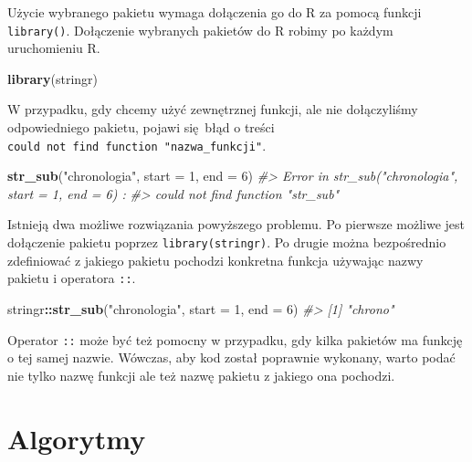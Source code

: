 \documentclass[paper=6in:9in,pagesize=pdftex,headinclude=on,footinclude=on,10pt]{scrbook}
\makeatletter
\newenvironment{Shaded}{\begin{snugshade}}{\end{snugshade}}
\newcommand{\CommentTok}[1]{\textcolor[rgb]{0.56,0.35,0.01}{\textit{#1}}}
\newcommand{\DataTypeTok}[1]{\textcolor[rgb]{0.13,0.29,0.53}{#1}}
\newcommand{\DecValTok}[1]{\textcolor[rgb]{0.00,0.00,0.81}{#1}}
\newcommand{\KeywordTok}[1]{\textcolor[rgb]{0.13,0.29,0.53}{\textbf{#1}}}
\newcommand{\NormalTok}[1]{#1}
\newcommand{\OperatorTok}[1]{\textcolor[rgb]{0.81,0.36,0.00}{\textbf{#1}}}
\newcommand{\StringTok}[1]{\textcolor[rgb]{0.31,0.60,0.02}{#1}}
\newenvironment{kframe}{%
\medskip{}
\setlength{\fboxsep}{.8em}
 \def\at@end@of@kframe{}%
 \ifinner\ifhmode%
  \def\at@end@of@kframe{\end{minipage}}%
  \begin{minipage}{\columnwidth}%
 \fi\fi%
 \def\FrameCommand##1{\hskip\@totalleftmargin \hskip-\fboxsep
 \colorbox{shadecolor}{##1}\hskip-\fboxsep
     \hskip-\linewidth \hskip-\@totalleftmargin \hskip\columnwidth}%
 \MakeFramed {\advance\hsize-\width
   \@totalleftmargin\z@ \linewidth\hsize
   \@setminipage}}%
 {\par\unskip\endMakeFramed%
 \at@end@of@kframe}
\newenvironment{rmdblock}[1]
  {
  \begin{itemize}
  \renewcommand{\labelitemi}{
    \raisebox{-.7\height}[0pt][0pt]{
      {\setkeys{Gin}{width=3em,keepaspectratio}\texttt{[image: images/\#1]}}
    }
  }
  \setlength{\fboxsep}{1em}
  \begin{kframe}
  \item
  }
  {
  \end{kframe}
  \end{itemize}
  }
\newenvironment{rmdinfo}
  {\begin{rmdblock}{compass}}
  {\end{rmdblock}}
\makeatother
\begin{document}
Użycie wybranego pakietu wymaga dołączenia go do R za pomocą funkcji \texttt{library()}.
Dołączenie wybranych pakietów do R robimy po każdym uruchomieniu R.

\begin{Shaded}
\begin{Highlighting}[]
\KeywordTok{library}\NormalTok{(stringr)}
\end{Highlighting}
\end{Shaded}

W przypadku, gdy chcemy użyć zewnętrznej funkcji, ale nie dołączyliśmy odpowiedniego pakietu, pojawi się~błąd o treści \texttt{could\ not\ find\ function\ "nazwa\_funkcji"}.

\begin{Shaded}
\begin{Highlighting}[]
\KeywordTok{str_sub}\NormalTok{(}\StringTok{"chronologia"}\NormalTok{, }\DataTypeTok{start =} \DecValTok{1}\NormalTok{, }\DataTypeTok{end =} \DecValTok{6}\NormalTok{)}
\CommentTok{#> Error in str_sub("chronologia", start = 1, end = 6) : }
\CommentTok{#>  could not find function "str_sub"}
\end{Highlighting}
\end{Shaded}

Istnieją dwa możliwe rozwiązania powyższego problemu.
Po pierwsze możliwe jest dołączenie pakietu poprzez \texttt{library(stringr)}.
Po drugie można bezpośrednio zdefiniować z jakiego pakietu pochodzi konkretna funkcja używając nazwy pakietu i operatora \texttt{::}.

\begin{Shaded}
\begin{Highlighting}[]
\NormalTok{stringr}\OperatorTok{::}\KeywordTok{str_sub}\NormalTok{(}\StringTok{"chronologia"}\NormalTok{, }\DataTypeTok{start =} \DecValTok{1}\NormalTok{, }\DataTypeTok{end =} \DecValTok{6}\NormalTok{)}
\CommentTok{#> [1] "chrono"}
\end{Highlighting}
\end{Shaded}

\begin{rmdinfo}
Operator \texttt{::} może być też pomocny w przypadku, gdy kilka pakietów ma funkcję o tej samej nazwie.
Wówczas, aby kod został poprawnie wykonany, warto podać nie tylko nazwę funkcji ale też nazwę pakietu z jakiego ona pochodzi.
\end{rmdinfo}

\hypertarget{algorytmy}{%
\section{Algorytmy}\label{algorytmy}}
\end{document}
